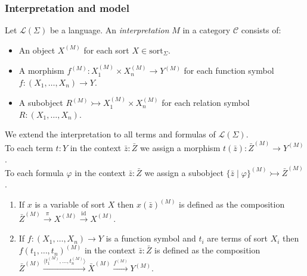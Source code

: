 \documentclass[14pt]{beamer}
\theoremstyle{plain}
\begin{document}
  \begin{frame}
    \frametitle{Interpretation and model}
    Let $\mathcal{L}(\Sigma)$ be a language. An \emph{interpretation} $M$ in a
    category $\mathcal{C}$ consists of:
    \begin{itemize}
      \item<2-> An object $X^{(M)}$ for each sort $X \in \mathrm{sort}_\Sigma$.
      \item<3-> A morphism $f^{(M)} : X_1^{(M)} \times X_n^{(M)} \to Y^{(M)}$
        for each function symbol $f : (X_1, \ldots, X_n) \to Y$.
      \item<4-> A subobject $R^{(M)} \rightarrowtail X_1^{(M)} \times X_n^{(M)}$
        for each relation symbol $R : (X_1, \ldots, X_n)$.
    \end{itemize}
  \end{frame}

  \begin{frame}
    We extend the interpretation to all terms and formulas of $\mathcal{L}(\Sigma)$.
    \pause \\
    \vspace{1em}
    To each term $t : Y$ in the context $\bar{z} : \bar{Z}$ we assign a morphism 
    $t(\bar{z}) : \bar{Z}^{(M)} \to Y^{(M)}$.
    \pause \\
    \vspace{1em}
    To each formula $\varphi$ in the context $\bar{z} : \bar{Z}$ we assign a subobject
    $\{ \bar{z} \mid \varphi \}^{(M)} \rightarrowtail \bar{Z}^{(M)}$.
  \end{frame}

  \begin{frame}
    \begin{enumerate}
      \item If $x$ is a variable of sort $X$ then $x(\bar{z})^{(M)}$ is defined as
        the composition $\bar{Z}^{(M)} \xrightarrow{\pi} X^{(M)} \xrightarrow{\mathrm{id}} X^{(M)}$.
        \vspace{1em}
      \item If $f : (X_1, \ldots, X_n) \to Y$ is a function symbol and $t_i$ are terms
        of sort $X_i$ then $f(t_1, \ldots, t_n)^{(M)}$ in the context $\bar{z} : \bar{Z}$ 
        is defined as the composition
        $ \bar{Z}^{(M)} \xrightarrow{\langle t_1^{(M)}, \ldots, t_n^{(M)} \rangle} \bar{X}^{(M)} 
        \xrightarrow{f^{(M)}} Y^{(M)}$.
    \end{enumerate}
  \end{frame}
\end{document}
